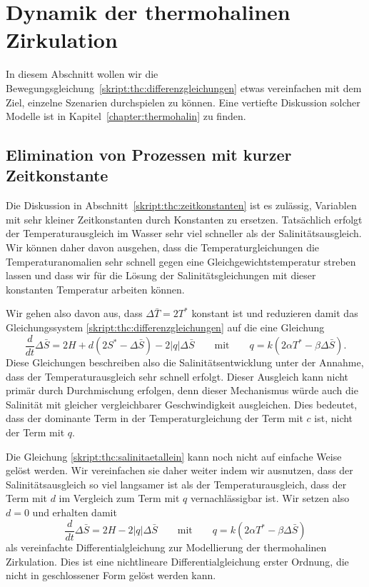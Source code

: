 %
%
%
\section{Dynamik der thermohalinen Zirkulation}
In diesem Abschnitt wollen wir die
Bewegungsgleichung~\eqref{skript:thc:differenzgleichungen}
etwas vereinfachen mit dem Ziel, einzelne Szenarien durchspielen
zu können.
Eine vertiefte Diskussion solcher Modelle ist in
Kapitel~\ref{chapter:thermohalin} zu finden.

\subsection{Elimination von Prozessen mit kurzer Zeitkonstante}
Die Diskussion in Abschnitt~\ref{skript:thc:zeitkonstanten}
ist es zulässig, Variablen mit sehr kleiner Zeitkonstanten
durch Konstanten zu ersetzen.
Tatsächlich erfolgt der Temperaturausgleich im Wasser sehr viel
schneller als der Salinitätsausgleich.
Wir können daher davon ausgehen, dass die Temperaturgleichungen
die Temperaturanomalien sehr schnell gegen eine Gleichgewichtstemperatur
streben lassen und dass wir für die Lösung der Salinitätsgleichungen
mit dieser konstanten Temperatur arbeiten können.

Wir gehen also davon aus, dass $\Delta\bar T=2T^*$ konstant ist und
reduzieren damit das Gleichungssystem
\eqref{skript:thc:differenzgleichungen}
auf die eine Gleichung
\begin{equation}
\frac{d}{dt}\Delta\bar S
=
2H + d(2S^* -\Delta\bar S) - 2|q|\Delta\bar S
\qquad\text{mit}\qquad
q=k(2\alpha T^* -\beta \Delta\bar S).
\label{skript:thc:salinitaetallein}
\end{equation}
Diese Gleichungen beschreiben also die Salinitätsentwicklung unter
der Annahme, dass der Temperaturausgleich sehr schnell erfolgt.
Dieser Ausgleich kann nicht primär durch Durchmischung erfolgen,
denn dieser Mechanismus würde auch die Salinität mit gleicher
vergleichbarer Geschwindigkeit ausgleichen.
Dies bedeutet, dass der dominante Term in der Temperaturgleichung
der Term mit $c$ ist, nicht der Term mit $q$.

Die Gleichung \eqref{skript:thc:salinitaetallein} kann noch nicht auf
einfache Weise gelöst werden.
Wir vereinfachen sie daher weiter indem wir ausnutzen, dass 
der Salinitätsausgleich so viel langsamer ist als der Temperaturausgleich,
dass der Term mit $d$ im Vergleich zum Term mit $q$ vernachlässigbar ist.
Wir setzen also $d=0$ und
erhalten damit 
\begin{equation}
\frac{d}{dt}\Delta\bar S
=
2H - 2|q|\Delta\bar S
\qquad\text{mit}\qquad
q=k(2\alpha T^* -\beta \Delta\bar S)
\label{skript:thc:qgleichung}
\end{equation}
als vereinfachte Differentialgleichung zur Modellierung der 
thermohalinen Zirkulation.
Dies ist eine nichtlineare Differentialgleichung erster Ordnung,
die nicht in geschlossener Form gelöst werden kann.

